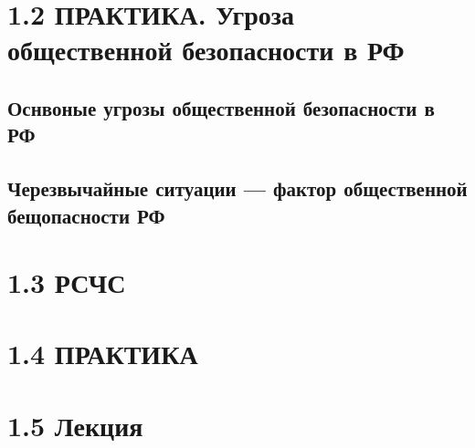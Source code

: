 \textsl{}\documentclass[oneside,final,14pt]{extreport}
\begin{document}
\chapter*{1.2 ПРАКТИКА. Угроза общественной безопасности в РФ}

\section*{Оснвоные угрозы общественной безопасности в РФ}

\section*{Черезвычайные ситуации --- фактор общественной бещопасности РФ}

\chapter*{1.3 РСЧС}


\chapter*{1.4 ПРАКТИКА}


\chapter*{1.5 Лекция}
\end{document}
